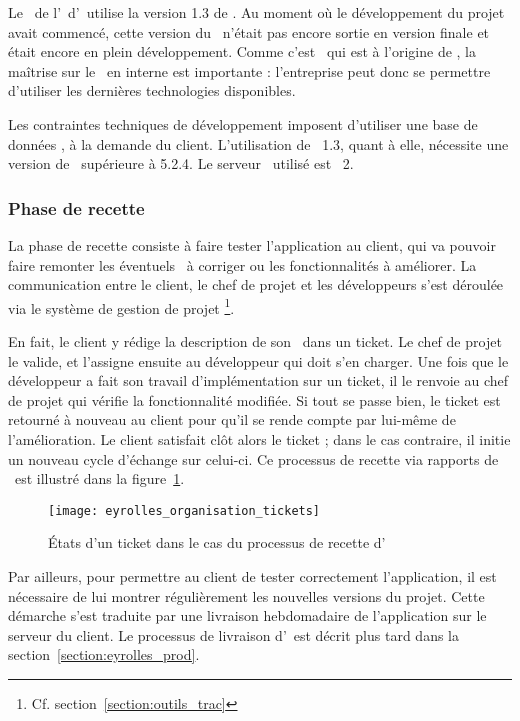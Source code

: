 Le \alotdeux\ de l'\aintranet\ d'\aey\ utilise la version 1.3 de \asf. Au moment où le développement du projet avait commencé, cette version du \afm\ n'était pas encore sortie en version finale et était encore en plein développement. Comme c'est \asl\ qui est à l'origine de \asf, la maîtrise sur le \afm\ en interne est importante : l'entreprise peut donc se permettre d'utiliser les dernières technologies disponibles.

Les contraintes techniques de développement imposent d'utiliser une base de données \apsql, à la demande du client. L'utilisation de \asf\ 1.3, quant à elle, nécessite une version de \aphp\ supérieure à 5.2.4. Le serveur \ahttp\ utilisé est \aapache~2.


\subsubsection{Phase de recette}
\label{section:eyrolles_organisation_recette}

La phase de recette consiste à faire tester l'application au client, qui va pouvoir faire remonter les éventuels \abugs\ à corriger ou les fonctionnalités à améliorer. La communication entre le client, le chef de projet et les dé\-ve\-lop\-peurs s'est déroulée via le système de gestion de projet \atrac\footnote{Cf. section~\ref{section:outils_trac}}.

En fait, le client y rédige la description de son \abug\ dans un ticket. Le chef de projet le valide, et l'assigne ensuite au développeur qui doit s'en charger. Une fois que le développeur a fait son travail d'implémentation sur un ticket, il le renvoie au chef de projet qui vérifie la fonctionnalité modifiée. Si tout se passe bien, le ticket est retourné à nouveau au client pour qu'il se rende compte par lui-même de l'amélioration. Le client satisfait clôt alors le ticket ; dans le cas contraire, il initie un nouveau cycle d'échange sur celui-ci. Ce processus de recette via rapports de \abugs\ est illustré dans la figure~\ref{figure:eyrolles_organisation_tickets}.

\begin{figure}
	\centering
	\texttt{[image: eyrolles\_organisation\_tickets]}
	\caption{États d'un ticket dans le cas du processus de recette d'\aey}
	\label{figure:eyrolles_organisation_tickets}
\end{figure}

Par ailleurs, pour permettre au client de tester correctement l'application, il est nécessaire de lui montrer régulièrement les nouvelles versions du projet. Cette démarche s'est traduite par une livraison hebdomadaire de l'application sur le serveur du client. Le processus de livraison d'\aey\ est décrit plus tard dans la section~\ref{section:eyrolles_prod}.

